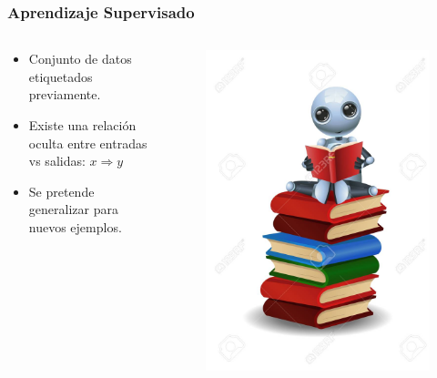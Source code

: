\documentclass[10pt]{beamer}
\begin{document}
\begin{frame}
    \frametitle{Aprendizaje Supervisado}
    \begin{columns}
        \begin{column}{0.5\textwidth}
          \begin{itemize}
              \item Conjunto de datos etiquetados previamente.
              \item Existe una relación oculta entre entradas vs salidas: $x\Rightarrow y$
              \item Se pretende generalizar para nuevos ejemplos.
          \end{itemize}
        \end{column}
        \begin{column}{0.5\textwidth}
          \begin{figure}[!h] 
            \centering
            \includegraphics[width=1\textwidth]{img/robot2}
          \end{figure}  
        \end{column}
      \end{columns}

\end{frame}
\end{document}

